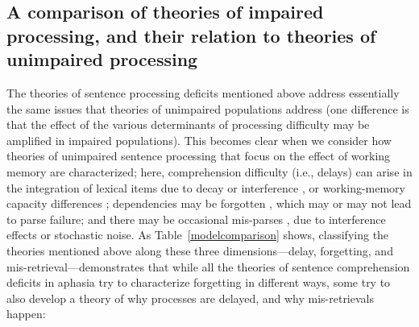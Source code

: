 \documentclass{cambridge7A}\usepackage[]{graphicx}\usepackage[]{color}
\begin{document}
\subsection{A comparison of theories of impaired processing, and their relation to theories of unimpaired processing}

The theories of sentence processing deficits mentioned above address essentially the same issues that theories of unimpaired populations address (one difference is that the effect of the various determinants of processing difficulty may be amplified in impaired populations). This becomes clear when we consider how  theories of unimpaired sentence processing that focus on the effect of  working memory are characterized; here, comprehension difficulty (i.e., delays) can arise in the integration of lexical items due to  decay or  interference \citep{vandykelewis03}, or working-memory capacity differences \citep{JustCarpenter1992}; dependencies may be forgotten \citep{taboretal04,VasishthSuckowLewis2010,FrankTrompenaarsVasishth2015}, which may or may not lead to parse failure; and there may be occasional mis-parses \citep{WagersLauPhillips2009,BadeckerStraub2002,VasishthBruessowLewis2008,CunningsFelser2013,PatilVasishthLewis2016}, due to interference effects or stochastic noise.
As Table~\ref{modelcomparison} shows, classifying the theories mentioned above along these three dimensions---delay, forgetting, and mis-retrieval---demonstrates that while all the theories of sentence comprehension deficits in aphasia try to characterize forgetting in different ways, some try to also develop a theory of why processes are delayed, and why mis-retrievals happen:
\end{document}
